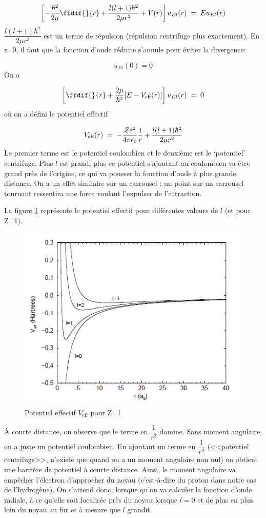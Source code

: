 \[
    \left[-\dfrac{\hbar^2}{2\mu}\ffdif{}{r}+\dfrac{l(l+1)\hbar^2}{2 \mu r^2}+V(r)\right] u_{El}(r)\eq Eu_{El}(r)
\]
$\dfrac{l(l+1)\hbar^2}{2\mu r^2}$ est un terme de répulsion (répulsion centrifuge plus exactement). En r=0, il faut que la fonction d'onde réduite s'annule pour éviter la divergence:

\[u_{El}(0)=0\]
On a

\begin{equation}
    \left[\ffdif{}{r}+\dfrac{2\mu}{\hbar^2}[E-V_\text{eff}(r)]\right]u_{El}(r)\eq 0
    \label{jsp}
\end{equation}
où on a défini le potentiel effectif

\[
    V_\text{eff}(r)\; = \; -\dfrac{Ze^2}{4\pi \epsilon_0}\dfrac{1}{r}+\dfrac{l(l+1)\hbar^2}{2\mu r^2}
\]
Le premier terme est le potentiel coulombien et le deuxième est le `potentiel' centrifuge. Plus $l$ est grand, plus ce potentiel s'ajoutant au coulombien va être grand près de l'origine, ce qui va pousser la fonction d'onde à plus grande distance. On a un effet similaire sur un carrousel : un point sur un carrousel tournant ressentira une force voulant l'expulser de l'attraction.

La figure \ref{fig:potentieleffectif} représente le potentiel effectif pour différentes valeurs de $l$ (et pour Z=1).

\begin{figure}[htp]
    \centering
    \includegraphics[scale=0.80]{Images2/rad.PNG}
    \caption{Potentiel effectif $V_\text{eff}$ pour Z=1}
    \label{fig:potentieleffectif}
\end{figure}
À courte distance, on observe que le terme en $\dfrac{1}{r^2}$ domine. Sans moment angulaire, on a juste un potentiel coulombien. En ajoutant un terme en $\dfrac{1}{r^2}$ (<<potentiel centrifuge>>, n'existe que quand on a un moment angulaire non nul) on obtient une barrière de potentiel à courte distance. Ainsi, le moment angulaire va empêcher l'électron d'approcher du noyau (c'est-à-dire du proton dans notre cas de l'hydrogène). On s'attend donc, lorsque qu'on va calculer la fonction d'onde radiale, à ce qu'elle soit localisée près du noyau lorsque $l=0$ et de plus en plus loin du noyau au fur et à mesure que $l$ grandit.


